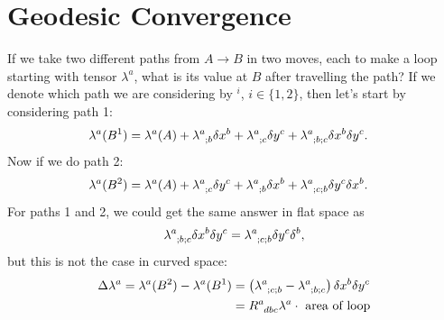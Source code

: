 \documentclass[a4paper, 11pt, normalem]{report}
\begin{document}
\section{Geodesic Convergence}
\begin{figure}
    \centering
\end{figure}
If we take two different paths from $A\to B$ in two moves, each to make a loop starting with tensor $\lambda^a$, what is its value at $B$ after travelling the path?
If we denote which path we are considering by $^i$, $i\in\{1,2\}$, then let's start by considering path 1:
\begin{align}
    \lambda^a(B^1) &= \lambda^a(A) + \tensor{\lambda}{^a_{;b}}\delta x^b + \tensor{\lambda}{^a_{;c}}\delta y^c + \tensor{\lambda}{^a_{;b;c}}\delta x^b\delta y^c.
\end{align}
Now if we do path 2:
\begin{align}
    \lambda^a(B^2) &= \lambda^a(A) + \tensor{\lambda}{^a_{;c}}\delta y^c + \tensor{\lambda}{^a_{;b}}\delta x^b + \tensor{\lambda}{^a_{;c;b}}\delta y^c\delta x^b.
\end{align}
For paths 1 and 2, we could get the same answer in flat space as
\begin{align}
    \tensor{\lambda}{^a_{;b;c}}\delta x^b\delta y^c = \tensor{\lambda}{^a_{;c;b}}\delta y^c\delta^b,
\end{align}
but this is not the case in curved space:
\begin{align}
    \begin{split}
        \Delta\lambda^a = \lambda^a(B^2)-\lambda^a(B^1) &= \left(\tensor{\lambda}{^a_{;c;b}}-\tensor{\lambda}{^a_{;b;c}}\right)\delta x^b\delta y^c \\
                                                        &= \tensor{R}{^a_{dbc}}\lambda^a\cdot\text{ area of loop}
    \end{split}
\end{align}
\end{document}
